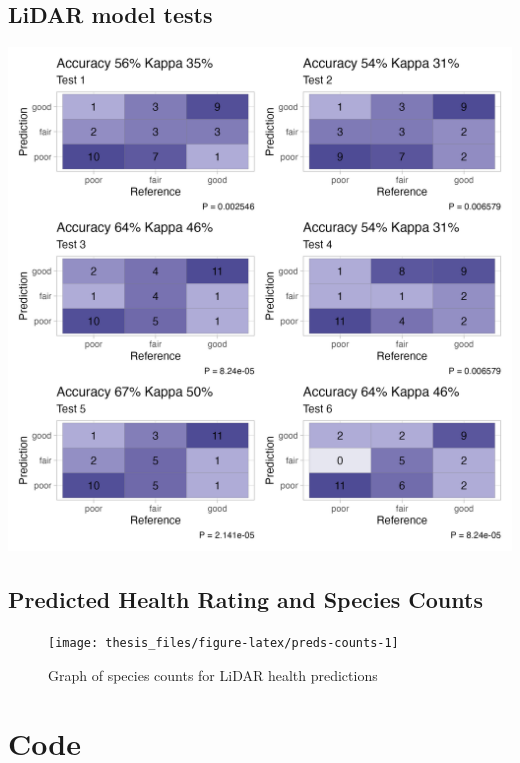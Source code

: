 \documentclass[12pt,twoside]{reedthesis}
\begin{document}
\hypertarget{lidar-model-tests-extra}{%
\section{LiDAR model tests}\label{lidar-model-tests-extra}}
\begin{center}\includegraphics[width=1\linewidth]{figure/test} \end{center}

\hypertarget{predicted-health-rating-and-species-counts}{%
\section{Predicted Health Rating and Species Counts}\label{predicted-health-rating-and-species-counts}}
\begin{figure}

{\centering \texttt{[image: thesis\_files/figure-latex/preds-counts-1]} 

}

\caption{Graph of species counts for LiDAR health predictions}\label{fig:preds-counts}
\end{figure}
\hypertarget{code-chunks}{%
\chapter{Code}\label{code-chunks}}
\end{document}
